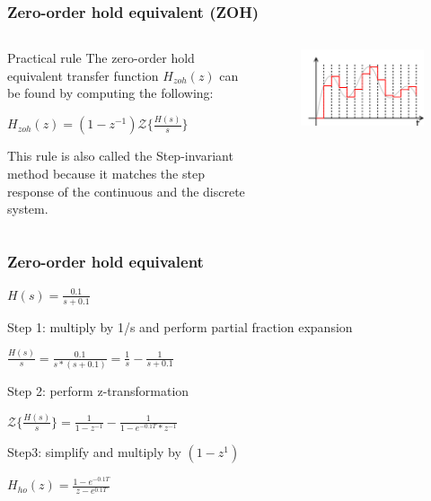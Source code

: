 \begin{frame}
	\frametitle{Zero-order hold equivalent (ZOH)}
\begin{columns}
	\begin{column}{0.5\textwidth}
	\begin{block}{Practical rule}
		The zero-order hold equivalent transfer function $H_{zoh}(z)$ can be found by computing the following:
		\begin{center}
			$H_{zoh}(z) = (1 - z^{-1}) \mathcal{Z}\{\frac{H(s)}{s}\}$
		\end{center}
		This rule is also called the Step-invariant method because it matches the step response of the continuous and the discrete system.
	\end{block}
	\end{column}
	
	\begin{column}{0.5\textwidth}
		\begin{figure}
			\centering
			\includegraphics[width=1\linewidth]{zero-order}
		\end{figure}
	\end{column}
\end{columns}
\end{frame}

\begin{frame}
	\frametitle{Zero-order hold equivalent}
	\begin{example}
		\begin{center}
			$H(s) = \frac{0.1}{s + 0.1}$
		\end{center}
		Step 1: multiply by 1/s and perform partial fraction expansion
		\begin{center}
			$\frac{H(s)}{s} = \frac{0.1}{s * (s + 0.1)} = \frac{1}{s} - \frac{1}{s + 0.1}$
		\end{center}
		Step 2: perform z-transformation
		\begin{center}
			$\mathcal{Z} \{\frac{H(s)}{s}\} = \frac{1}{1 - z^{-1}} - \frac{1}{1 - e^{-0.1T} * z^{-1}}$
		\end{center}
		Step3: simplify and multiply by $(1-z^{1})$
		\begin{center}
			$H_{ho}(z) = \frac{1 - e^{-0.1T}}{z - e^{0.1T}}$
		\end{center}
	\end{example}
\end{frame}

